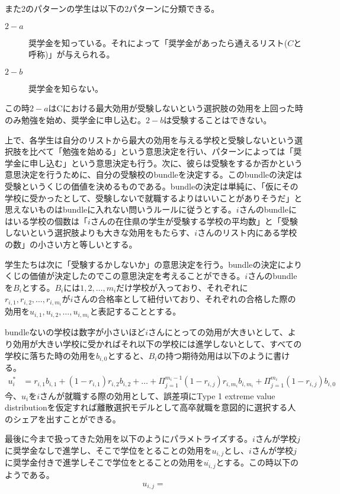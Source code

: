 \documentclass{jsarticle}
\begin{document}
	\par
	また2のパターンの学生は以下の2パターンに分類できる。
	\begin{description}
		\item[$2-a$] 奨学金を知っている。それによって「奨学金があったら通えるリスト($C$と呼称)」が与えられる。
		\item[$2-b$] 奨学金を知らない。
	\end{description}
	この時$2-a$はCにおける最大効用が受験しないという選択肢の効用を上回った時のみ勉強を始め、奨学金に申し込む。$2-b$は受験することはできない。
	\par
	上で、各学生は自分のリストから最大の効用を与える学校と受験しないという選択肢を比べて「勉強を始める」という意思決定を行い、パターンによっては「奨学金に申し込む」という意思決定も行う。次に、彼らは受験をするか否かという意思決定を行うために、自分の受験校のbundleを決定する。このbundleの決定は受験というくじの価値を決めるものである。bundleの決定は単純に、「仮にその学校に受かったとして、受験しないで就職するよりはいいことがありそうだ」と思えないものはbundleに入れない問いうルールに従うとする。$i$さんのbundleにはいる学校の個数は「$i$さんの在住県の学生が受験する学校の平均数」と「受験しないという選択肢よりも大きな効用をもたらす、$i$さんのリスト内にある学校の数」の小さい方と等しいとする。
	\par
	学生たちは次に「受験するかしないか」の意思決定を行う。bundleの決定によりくじの価値が決定したのでこの意思決定を考えることができる。$i$さんのbundleを$B_i$とする。$B_i$には$1,2, \dots, m_i$だけ学校が入っており、それぞれに$r_{i,1}, r_{i,2}, \dots, r_{i,m_i}$が$i$さんの合格率として紐付いており、それぞれの合格した際の効用を$u_{i, 1}, u_{i, 2}, \dots, u_{i, m_{i}}$と表記することとする。
	\par
	bundleないの学校は数字が小さいほど$i$さんにとっての効用が大きいとして、より効用が大きい学校に受かればそれ以下の学校には進学しないとして、すべての学校に落ちた時の効用を$b_{i, 0}$とすると、$B_i$の持つ期待効用は以下のように書ける。
	\begin{align*}
		u_i^* &= r_{i, 1}b_{i, 1} + (1-r_{i, 1})r_{i, 2} b_{i, 2} + \dots + \Pi_{j = 1}^{m_i - 1} (1 - r_{i, j}) r_{i, m_{i}} b_{i, m_{i}} + \Pi_{j = 1}^{m_{i}} (1 - r_{i, j}) b_{i, 0} 
	\end{align*}
	今、$u_i$を$i$さんが就職する際の効用として、誤差項にType 1 extreme value distributionを仮定すれば離散選択モデルとして高卒就職を意図的に選択する人のシェアを出すことができる。
	\par
	最後に今まで扱ってきた効用を以下のようにパラメトライズする。$i$さんが学校$j$に奨学金なしで進学し、そこで学位をとることの効用を$u_{i, j}$とし、$i$さんが学校$j$に奨学金付きで進学しそこで学位をとることの効用を$\dot{u_{i, j}}$とする。この時以下のようである。
	\begin{align*}
		u_{i, j} = 
	\end{align*}
\end{document}
